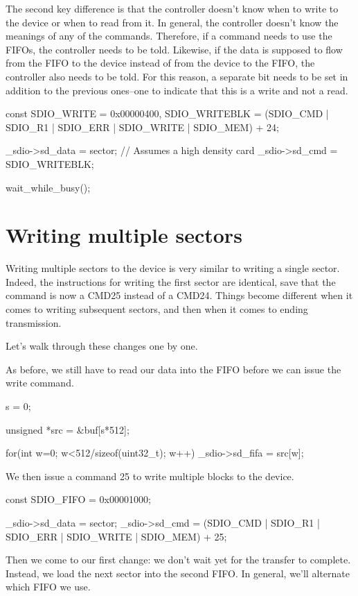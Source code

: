 \documentclass{gqtekspec}
\begin{document}
The second key difference is that the controller doesn't know when to write
to the device or when to read from it.  In general, the controller doesn't
know the meanings of any of the commands.  Therefore, if a command needs to
use the FIFOs, the controller needs to be told.  Likewise, if the data is
supposed to flow from the FIFO to the device instead of from the device to
the FIFO, the controller also needs to be told.  For this reason, a separate
bit needs to be set in addition to the previous ones--one to indicate that
this is a write and not a read.

\begin{zCpp}
	const	SDIO_WRITE    = 0x00000400,
		SDIO_WRITEBLK = (SDIO_CMD | SDIO_R1 | SDIO_ERR
				| SDIO_WRITE | SDIO_MEM) + 24;

	_sdio->sd_data = sector;	// Assumes a high density card
	_sdio->sd_cmd  = SDIO_WRITEBLK;

	wait_while_busy();
\end{zCpp}
\section{Writing multiple sectors}
Writing multiple sectors to the device is very similar to writing a single
sector.  Indeed, the instructions for writing the first sector are identical,
save that the command is now a CMD25 instead of a CMD24.  Things become
different when it comes to writing subsequent sectors, and then when it comes
to ending transmission.

Let's walk through these changes one by one.

As before, we still have to read our data into the FIFO before we can issue
the write command.

\begin{zCpp}
	s = 0;

	unsigned *src = &buf[s*512];

	for(int w=0; w<512/sizeof(uint32_t); w++)
		_sdio->sd_fifa = src[w];
\end{zCpp}

We then issue a command 25 to write multiple blocks to the device.

\begin{zCpp}
	const	SDIO_FIFO  = 0x00001000;

	_sdio->sd_data = sector;
	_sdio->sd_cmd  = (SDIO_CMD | SDIO_R1 | SDIO_ERR
				| SDIO_WRITE | SDIO_MEM) + 25;
\end{zCpp}

Then we come to our first change: we don't wait yet for the transfer to
complete.  Instead, we load the next sector into the second FIFO.  In general,
we'll alternate which FIFO we use.
\end{document}
